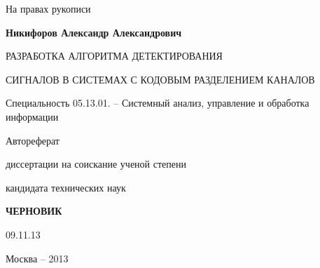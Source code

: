\hfill На правах рукописи

\vspace{\baselineskip}
\vspace{\baselineskip}
\vspace{\baselineskip}
\vspace{\baselineskip}

\noindent\centerline{\bf{Никифоров Александр Александрович}}

\vspace{\baselineskip}
\vspace{\baselineskip}
\vspace{\baselineskip}
\vspace{\baselineskip}

\noindent\centerline{РАЗРАБОТКА АЛГОРИТМА ДЕТЕКТИРОВАНИЯ}
\noindent\centerline{СИГНАЛОВ В СИСТЕМАХ С КОДОВЫМ РАЗДЕЛЕНИЕМ КАНАЛОВ}

\vspace{\baselineskip}
\vspace{\baselineskip}
\vspace{\baselineskip}
\vspace{\baselineskip}

\noindent\centerline{Специальность 05.13.01. – Системный анализ, управление и обработка информации}

\vspace{\baselineskip}
\vspace{\baselineskip}
\vspace{\baselineskip}
\vspace{\baselineskip}

\noindent\centerline{Автореферат} 
\noindent\centerline{диссертации на соискание ученой степени}
\noindent\centerline{кандидата технических наук}


\vspace{\baselineskip}
\vspace{\baselineskip}
\vspace{\baselineskip}
\vspace{\baselineskip}
\noindent\centerline{\bf{ЧЕРНОВИК}}
\noindent\centerline{09.11.13}

\vfill
\noindent\centerline{Москва – 2013}

\newpage

\vspace{\baselineskip}
\vspace{\baselineskip}
\vspace{\baselineskip}
\vspace{\baselineskip}

